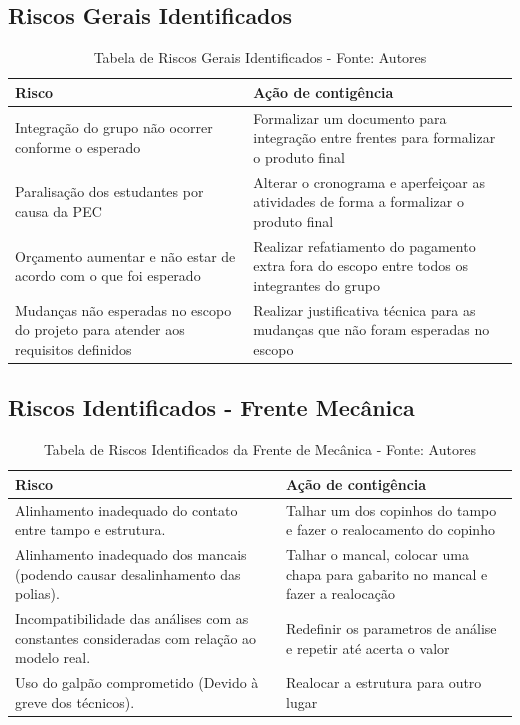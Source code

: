 \subsection*{Riscos Gerais Identificados}

\begin{table}[H]
    \begin{tabular}{|p{7cm}|p{7cm}|}
        \hline
        \textbf{Risco} & \textbf{Ação de contigência} \\ \hline
        Integração do grupo não ocorrer conforme o esperado & Formalizar um documento para integração entre frentes para formalizar o produto final  \\ \hline
        Paralisação dos estudantes por causa da PEC & Alterar o cronograma e aperfeiçoar as atividades de forma a formalizar o produto final \\ \hline
        Orçamento aumentar e não estar de acordo com o que foi esperado & Realizar refatiamento do pagamento extra fora do escopo entre todos os integrantes do grupo \\ \hline
        Mudanças não esperadas no escopo do projeto para atender aos requisitos definidos & Realizar justificativa técnica para as mudanças que não foram esperadas no escopo\\ \hline
    \end{tabular}
    \caption{Tabela de Riscos Gerais Identificados - Fonte: Autores}
    \label{tab:tabela_riscos_gerais_pc2}
\end{table}

\subsection*{Riscos Identificados - Frente Mecânica}

\begin{table}[H]
    \begin{tabular}{|p{7cm}|p{7cm}|}
        \hline
        \textbf{Risco} & \textbf{Ação de contigência} \\ \hline
        Alinhamento inadequado do contato entre tampo e estrutura. & Talhar um dos copinhos do tampo e fazer o realocamento do copinho \\ \hline
        Alinhamento inadequado dos mancais (podendo causar desalinhamento das polias). & Talhar o mancal, colocar uma chapa para gabarito no mancal e fazer a realocação \\ \hline
        Incompatibilidade das análises com as constantes consideradas com relação ao modelo real. & Redefinir os parametros de análise e repetir até acerta o valor \\ \hline
        Uso do galpão comprometido (Devido à greve dos técnicos). & Realocar a estrutura para outro lugar \\ \hline
    \end{tabular}
    \caption{Tabela de Riscos Identificados da Frente de Mecânica - Fonte: Autores}
    \label{tab:tabela_riscos_mecanica}
\end{table}

